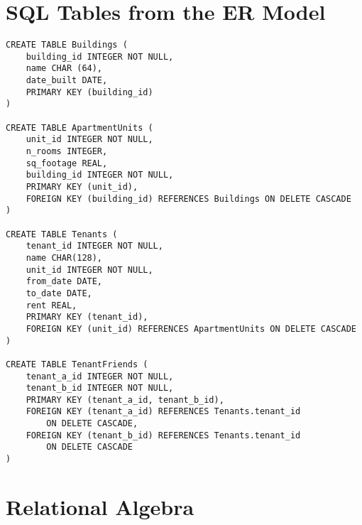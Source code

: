\documentclass{homework}
\begin{document}
\newpage

\section{SQL Tables from the ER Model}

\begin{verbatim}
CREATE TABLE Buildings (
    building_id INTEGER NOT NULL,
    name CHAR (64),
    date_built DATE,
    PRIMARY KEY (building_id)
)

CREATE TABLE ApartmentUnits (
    unit_id INTEGER NOT NULL,
    n_rooms INTEGER,
    sq_footage REAL,
    building_id INTEGER NOT NULL,
    PRIMARY KEY (unit_id),
    FOREIGN KEY (building_id) REFERENCES Buildings ON DELETE CASCADE
)

CREATE TABLE Tenants (
    tenant_id INTEGER NOT NULL,
    name CHAR(128),
    unit_id INTEGER NOT NULL,
    from_date DATE,
    to_date DATE,
    rent REAL,
    PRIMARY KEY (tenant_id),
    FOREIGN KEY (unit_id) REFERENCES ApartmentUnits ON DELETE CASCADE
)

CREATE TABLE TenantFriends (
    tenant_a_id INTEGER NOT NULL,
    tenant_b_id INTEGER NOT NULL,
    PRIMARY KEY (tenant_a_id, tenant_b_id),
    FOREIGN KEY (tenant_a_id) REFERENCES Tenants.tenant_id
        ON DELETE CASCADE,
    FOREIGN KEY (tenant_b_id) REFERENCES Tenants.tenant_id
        ON DELETE CASCADE
)
\end{verbatim}

\newpage

\section{Relational Algebra}
\end{document}
